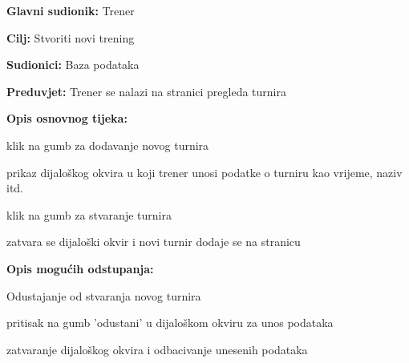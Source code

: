 					\noindent {}
					\begin{packed_item}
	
						\item \textbf{Glavni sudionik: }Trener
						\item  \textbf{Cilj: } Stvoriti novi trening
						\item  \textbf{Sudionici: } Baza podataka
						\item  \textbf{Preduvjet: } Trener se nalazi na stranici pregleda turnira
						\item  \textbf{Opis osnovnog tijeka:}
						
						\item[] \begin{packed_enum}
	
							\item klik na gumb za dodavanje novog turnira
							\item prikaz dijaloškog okvira u koji trener unosi podatke o turniru kao vrijeme, naziv itd.
							\item klik na gumb za stvaranje turnira
							\item zatvara se dijaloški okvir i novi turnir dodaje se na stranicu
							
						\end{packed_enum}
						
						\item  \textbf{Opis mogućih odstupanja:}
						
						\item[] \begin{packed_item}
	
							\item Odustajanje od stvaranja novog turnira
							\item[] \begin{packed_enum}
								
								\item pritisak na gumb 'odustani' u dijaloškom okviru za unos podataka
								\item zatvaranje dijaloškog okvira i odbacivanje unesenih podataka
								
							\end{packed_enum}
							
						\end{packed_item}
					\end{packed_item}
					
